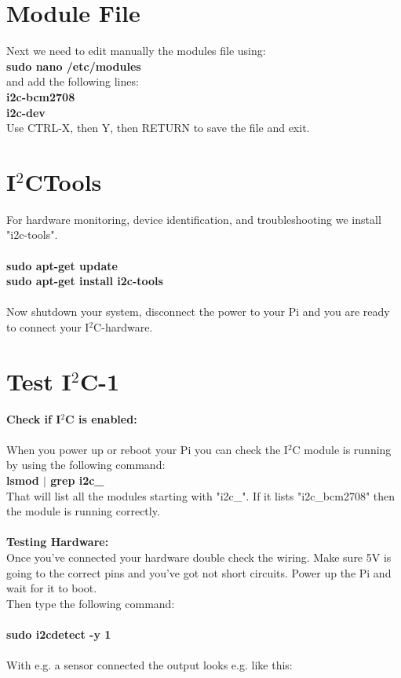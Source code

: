 \section{Module File}
\label{sec:modulefile}
Next we need to edit manually the modules file using:\\
\ttfamily \textbf{sudo nano /etc/modules}\\
\normalfont and add the following lines:\\
\ttfamily \textbf{i2c-bcm2708\\
									i2c-dev}\\
\normalfont									
Use CTRL-X, then Y, then RETURN to save the file and exit.								





\section{I$^2$CTools}
\label{sec:I2Ctools}

For hardware monitoring, device identification, and troubleshooting we install "i2c-tools".\\\\
\ttfamily \textbf{sudo apt-get update\\
									sudo apt-get install i2c-tools}\\\\
\normalfont
Now shutdown your system, disconnect the power to your Pi and you are ready to connect your I$^2$C-hardware.\\									


\section{Test I$^2$C-1}
\label{sec:testi2c1}

\textbf{Check if I$^2$C is enabled:}\\\\
When you power up or reboot your Pi you can check the I$^2$C module is running by using the following command:\\
\ttfamily \textbf{lsmod $|$ grep i2c\_}\\
\normalfont
That will list all the modules starting with "i2c\_". If it lists "i2c\_bcm2708" then the module is running correctly.\\\\

\textbf{Testing Hardware:}\\
Once you've connected your hardware double check the wiring. Make sure 5V is going to the correct pins and you've got not short circuits. Power up the Pi and wait for it to boot.\\
Then type the following command:\\\\
\ttfamily \textbf{sudo i2cdetect -y 1}\\\\
\normalfont 
With e.g. a sensor connected the output looks e.g. like this:\\

